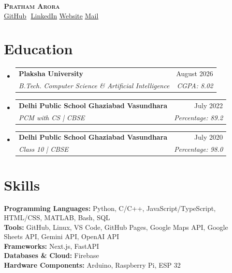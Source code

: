 \documentclass[letterpaper,11pt]{article}
\makeatletter
\newcommand{\resumeSubheading}[4]{
  \vspace{-2pt}\item
    \begin{tabular*}{0.97\textwidth}[t]{l@{\extracolsep{\fill}}r}
      \textbf{#1} & #2 \\
      \textit{\small#3} & \textit{\small #4} \\
    \end{tabular*}\vspace{-7pt}
}
\newcommand{\resumeSubHeadingListStart}{\begin{itemize}[leftmargin=0.15in, label={}]}
\newcommand{\resumeSubHeadingListEnd}{\end{itemize}}
\makeatother
\begin{document}
\begin{center}
    \textbf{\Huge \scshape Pratham Arora} \\ \vspace{16pt}
    \small 
    \href{https://github.com/prats3992}{\underline{GitHub}} $  $
    \href{https://www.linkedin.com/in/pratham3992arora}{\underline{LinkedIn}} 
    \href{https://pratham-arora.vercel.app/}{\underline{Website}}
    \href{mailto:pratham3992@gmail.com}{\underline{Mail}}
\end{center}

\section{Education}
  \resumeSubHeadingListStart
  
    \resumeSubheading
      {Plaksha University}{August 2026}
      {B.Tech. Computer Science \& Artificial Intelligence}{CGPA: 8.02}
      
    \resumeSubheading
      {Delhi Public School Ghaziabad Vasundhara}{July 2022}
      {PCM with CS | CBSE}{Percentage: 89.2}

    \resumeSubheading
      {Delhi Public School Ghaziabad Vasundhara}{July 2020}
      {Class 10 | CBSE}{Percentage: 98.0}

  \resumeSubHeadingListEnd

\section{Skills}
 \begin{itemize}[leftmargin=0.15in, label={}]
    \small{\item{
     \textbf{Programming Languages:} Python, C/C++, JavaScript/TypeScript, HTML/CSS, MATLAB, Bash, SQL \\
     \textbf{Tools:} GitHub, Linux, VS Code, GitHub Pages, Google Maps API, Google Sheets API, Gemini API, OpenAI API\\
     \textbf{Frameworks:} Next.js, FastAPI \\
     \textbf{Databases \& Cloud:} Firebase \\
     \textbf{Hardware Components:} Arduino, Raspberry Pi, ESP 32
    }}
 \end{itemize}
\end{document}
